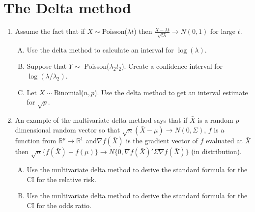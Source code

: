 \documentclass[12pt]{article}
\begin{document}
\section{The Delta method}
\begin{enumerate}[1.]
\item Assume the fact that if $X\sim$Poisson($\lambda t$) then 
  $\frac{X - \lambda t}{\sqrt{t\lambda}} \rightarrow N(0,1)$ for large $t$.
    \begin{enumerate}[A.]
    \item Use the delta method to calculate an interval for $\log(\lambda)$.
    \item Suppose that $Y \sim$ Poisson($\lambda_2 t_2$). Create a 
      confidence interval for $\log(\lambda / \lambda_2)$. 
\item Let $X \sim $Binomial($n,p$). Use the delta method to get an interval
  estimate for $\sqrt{p}$. 
    \end{enumerate}
\item An example of the multivariate delta method says that if $\bar X$ is a random
  $p$ dimensional random vector so that $\sqrt{n}(\bar X - \mu) \rightarrow N(0, \Sigma )$,  $f$ is a function from
  $\mathbb{R}^p \rightarrow \mathbb{R}^1$ and$\nabla f (\bar X)$ is the gradient vector of $f$ evaluated at $\bar X$
  then $\sqrt{n} \{f(\bar X) - f(\mu)\} \rightarrow N\{0, \nabla f(\bar X)' \Sigma \nabla f(\bar X)\}$ (in distribution).
  \begin{enumerate}[A.]
  \item Use the multivariate delta method to derive the standard formula for the CI for the relative risk.
  \item Use the multivariate delta method to derive the standard formula for the CI for the odds ratio.
  \end{enumerate}
\end{enumerate}
\end{document}
